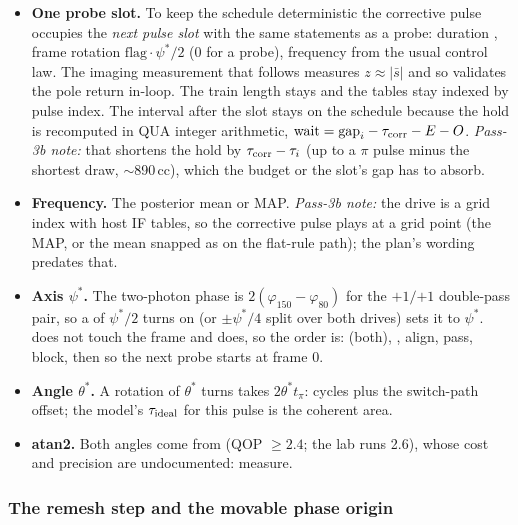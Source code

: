 \begin{itemize}[nosep]
  \item \textbf{One probe slot.} To keep the schedule deterministic the
    corrective pulse occupies the \emph{next pulse slot} with the same
    statements as a probe: duration ,
    frame rotation $\mathrm{flag}\cdot\psi^*/2$ (0 for a probe), frequency from
    the usual control law. The imaging measurement that follows measures $z
    \approx |\bar s|$ and so validates the pole return in-loop. The train length
    stays  and the tables stay indexed by pulse index. The
    interval after the slot stays on the schedule because the hold is
    recomputed in QUA integer arithmetic, $\mathrm{wait} = \mathrm{gap}_i -
    \tau_{\rm corr} - E - O$. \emph{Pass-3b note:} that shortens the hold by
    $\tau_{\rm corr} - \tau_i$ (up to a $\pi$ pulse minus the shortest draw,
    $\sim$890\,cc), which the budget or the slot's gap has to absorb.
  \item \textbf{Frequency.} The posterior mean or MAP. \emph{Pass-3b note:} the
    drive is a grid index with host IF tables, so the corrective pulse plays
    at a grid point (the MAP, or the mean snapped as on the flat-rule path);
    the plan's  wording predates that.
  \item \textbf{Axis $\psi^*$.} The two-photon phase is $2(\varphi_{150} -
    \varphi_{80})$ for the $+1/{+1}$ double-pass pair, so a
     of $\psi^*/2$ turns on  (or
    $\pm\psi^*/4$ split over both drives) sets it to $\psi^*$.
     does not touch the frame and 
    does, so the order is:  (both),
    , align, pass, block, then 
    so the next probe starts at frame 0.
  \item \textbf{Angle $\theta^*$.} A rotation of $\theta^*$ turns takes $2\theta^*
    t_\pi$:  cycles plus
    the switch-path offset; the model's $\tau_{\rm ideal}$ for this pulse is the
    coherent area.
  \item \textbf{atan2.} Both angles come from  (QOP
    $\ge 2.4$; the lab runs 2.6), whose cost and precision are undocumented:
    measure.
\end{itemize}

\subsubsection{The remesh step and the movable phase origin}

